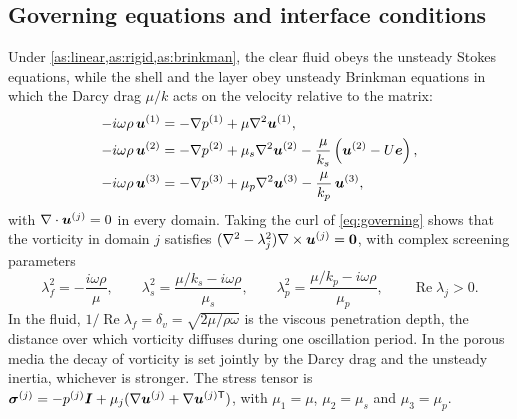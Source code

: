 \subsection{Governing equations and interface conditions}\label{sec:equations}
Under \cref{as:linear,as:rigid,as:brinkman}, the clear fluid obeys the unsteady Stokes equations, while the shell and the
layer obey unsteady Brinkman equations in which the Darcy drag $\mu/k$ acts on the velocity relative to the matrix:
\begin{subequations}\label{eq:governing}
\begin{align}
  -i\omega\rho\,\bm{u}^{(1)}&=-\nabla p^{(1)}+\mu\nabla^2\bm{u}^{(1)}, \label{eq:stokes}\\
  -i\omega\rho\,\bm{u}^{(2)}&=-\nabla p^{(2)}+\mu_s\nabla^2\bm{u}^{(2)}-\frac{\mu}{k_s}\left(\bm{u}^{(2)}-U\bm{e}\right),\\
  -i\omega\rho\,\bm{u}^{(3)}&=-\nabla p^{(3)}+\mu_p\nabla^2\bm{u}^{(3)}-\frac{\mu}{k_p}\,\bm{u}^{(3)},
\end{align}
\end{subequations}
with $\nabla\cdot\bm{u}^{(j)}=0$ in every domain. Taking the curl of \cref{eq:governing} shows that the vorticity in domain
$j$ satisfies $(\nabla^2-\lambda_j^2)\nabla\times\bm{u}^{(j)}=\bm 0$, with complex screening parameters
\begin{equation}
  \lambda_f^2=-\frac{i\omega\rho}{\mu},\qquad
  \lambda_s^2=\frac{\mu/k_s-i\omega\rho}{\mu_s},\qquad
  \lambda_p^2=\frac{\mu/k_p-i\omega\rho}{\mu_p},\qquad\operatorname{Re}\lambda_j>0 .
  \label{eq:lambdas}
\end{equation}
In the fluid, $1/\operatorname{Re}\lambda_f=\delta_v=\sqrt{2\mu/\rho\omega}$ is the viscous penetration depth, the
distance over which vorticity diffuses during one oscillation period. In the porous media the decay of vorticity is
set jointly by the Darcy drag and the unsteady inertia, whichever is stronger. The stress tensor is
$\bm{\sigma}^{(j)}=-p^{(j)}\bm{I}+\mu_j(\nabla\bm{u}^{(j)}+\nabla\bm{u}^{(j)\mathsf T})$, with $\mu_1=\mu$, $\mu_2=\mu_s$ and
$\mu_3=\mu_p$.

